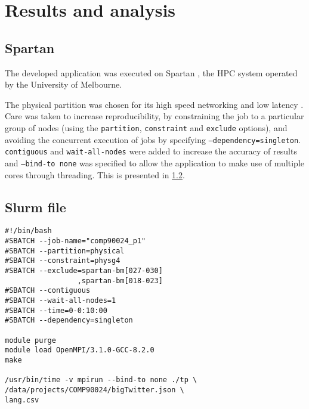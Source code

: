 \documentclass[10pt]{article}
\begin{document}
\vspace{-5pt}
\section{Results and analysis}
\label{results}
\subsection{Spartan}
The developed application was executed on
Spartan \cite{spartan}, 
the HPC system operated by the University of Melbourne. 

The physical partition was chosen for its high speed networking and low latency \cite{spartan2}. 
Care was taken to increase reproducibility, by constraining the job to a particular group of nodes (using the \texttt{partition}, \texttt{constraint} and \texttt{exclude} options), and avoiding the concurrent execution of jobs by specifying \texttt{--dependency=singleton}. 
\texttt{contiguous} and \texttt{wait-all-nodes} were added to increase the accuracy of results and
\texttt{--bind-to none} was specified to allow the application to make use of multiple cores through threading. This is presented in \ref{slurm}.


\vspace{-2pt}
\subsection{Slurm file}\label{slurm}
\begin{verbatim}
#!/bin/bash
#SBATCH --job-name="comp90024_p1"
#SBATCH --partition=physical
#SBATCH --constraint=physg4
#SBATCH --exclude=spartan-bm[027-030]
                 ,spartan-bm[018-023]
#SBATCH --contiguous
#SBATCH --wait-all-nodes=1
#SBATCH --time=0-0:10:00
#SBATCH --dependency=singleton

module purge
module load OpenMPI/3.1.0-GCC-8.2.0
make

/usr/bin/time -v mpirun --bind-to none ./tp \
/data/projects/COMP90024/bigTwitter.json \
lang.csv
\end{verbatim}
\end{document}
